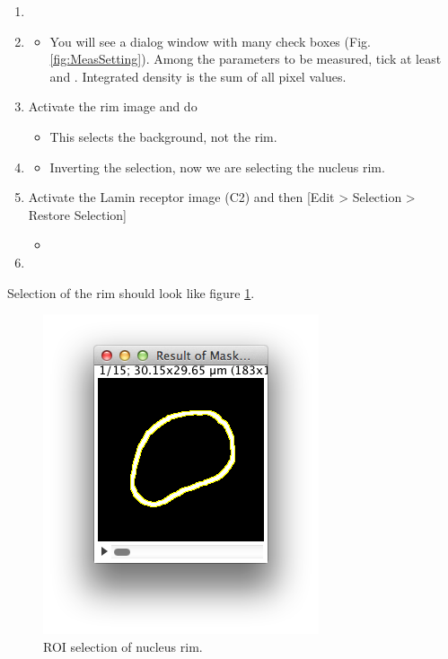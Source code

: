 \begin{enumerate}
  \item {}
  \item {}
  \begin{itemize}
    \item You will see a dialog window with many check boxes (Fig. \ref{fig:MeasSetting}). Among the parameters to be measured, tick at least  and . Integrated density is the sum of all pixel values. 
  \end{itemize}
  \item Activate the rim image and do 
  \begin{itemize}
    \item This selects the background, not the rim. 
  \end{itemize}
  \item {}
  \begin{itemize}
    \item Inverting the selection, now we are selecting the nucleus rim. 
  \end{itemize}
  \item Activate the Lamin receptor image (C2) and then [Edit > Selection > Restore Selection]
  \begin{itemize}
      \item 
  \end{itemize}
  \item {}
\end{enumerate}

Selection of the rim should look like figure \ref{fig_RoiNucRim}.

\begin{figure}[ht!]
\begin{center}
\includegraphics[scale=0.8]{fig/ROIselectionNucRim.png}
\caption{ROI selection of nucleus rim. }
\label{fig_RoiNucRim}
\end{center}
\end{figure}

